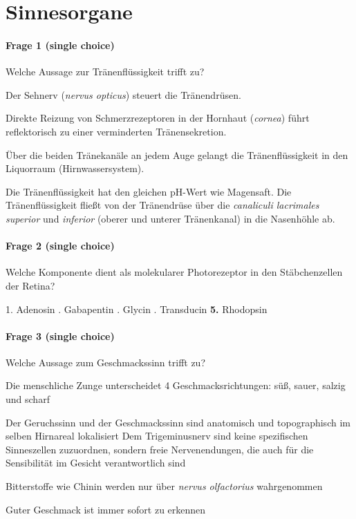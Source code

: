 \section*{Sinnesorgane}

\paragraph{Frage 1 (single choice)}

Welche Aussage zur Tränenflüssigkeit trifft zu?

\begin{benumerate}
  \item Der Sehnerv (\emph{nervus opticus}) steuert die Tränendrüsen.
  \item Direkte Reizung von Schmerzrezeptoren in der Hornhaut (\emph{cornea}) führt reflektorisch zu einer verminderten Tränensekretion.
  \item Über die beiden Tränekanäle an jedem Auge gelangt die Tränenflüssigkeit in den Liquorraum (Hirnwassersystem).
  \item Die Tränenflüssigkeit hat den gleichen pH-Wert wie Magensaft.
  \bolditem Die Tränenflüssigkeit fließt von der Tränendrüse über die \emph{canaliculi lacrimales superior} und \emph{inferior} (oberer und unterer Tränenkanal) in die Nasenhöhle ab.
\end{benumerate}

\paragraph{Frage 2 (single choice)}

Welche Komponente dient als molekularer Photorezeptor in den Stäbchenzellen der Retina?

1. Adenosin . Gabapentin . Glycin . Transducin \enskip \textbf{5.} Rhodopsin

\paragraph{Frage 3 (single choice)}

Welche Aussage zum Geschmackssinn trifft zu?
\begin{benumerate}
  \item Die menschliche Zunge unterscheidet 4 Geschmacksrichtungen: süß, sauer, salzig und scharf
  \item Der Geruchssinn und der Geschmackssinn sind anatomisch und topographisch im selben Hirnareal lokalisiert
  \bolditem Dem Trigeminusnerv sind keine spezifischen Sinneszellen zuzuordnen, sondern freie Nervenendungen, die auch für die Sensibilität im Gesicht verantwortlich sind
  \item Bitterstoffe wie Chinin werden nur über \emph{nervus olfactorius} wahrgenommen
  \item Guter Geschmack ist immer sofort zu erkennen
\end{benumerate}

